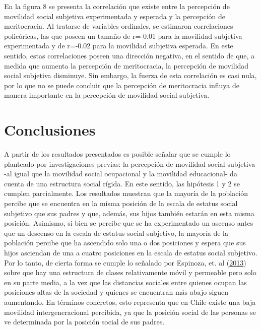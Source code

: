 \documentclass[
]{article}
\begin{document}
En la figura 8 se presenta la correlación que existe entre la percepción
de movilidad social subjetiva experimentada y esperada y la percepción
de meritocracia. Al tratarse de variables ordinales, se estimaron
correlaciones policóricas, las que poseen un tamaño de r=-0.01 para la
movilidad subjetiva experimentada y de r=-0.02 para la movilidad
subjetiva esperada. En este sentido, estas correlaciones poseen una
dirección negativa, en el sentido de que, a medida que aumenta la
percepción de meritocracia, la percepción de movilidad social subjetiva
disminuye. Sin embargo, la fuerza de esta correlación es casi nula, por
lo que no se puede concluir que la percepción de meritocracia influya de
manera importante en la percepción de movilidad social subjetiva.

\newpage

\hypertarget{conclusiones}{%
\section{Conclusiones}\label{conclusiones}}

A partir de los resultados presentados es posible señalar que se cumple
lo planteado por investigaciones previas: la percepción de movilidad
social subjetiva -al igual que la movilidad social ocupacional y la
movilidad educacional- da cuenta de una estructura social rígida. En
este sentido, las hipótesis 1 y 2 se cumplen parcialmente. Los
resultados muestran que la mayoría de la población percibe que se
encuentra en la misma posición de la escala de estatus social subjetivo
que sus padres y que, además, sus hijos también estarán en esta misma
posición. Asimismo, si bien se percibe que se ha experimentado un
ascenso antes que un descenso en la escala de estatus social subjetivo,
la mayoría de la población percibe que ha ascendido solo una o dos
posiciones y espera que sus hijos asciendan de una a cuatro posiciones
en la escala de estatus social subjetivo. Por lo tanto, de cierta forma
se cumple lo señalado por Espinoza, et. al
(\protect\hyperlink{ref-espinoza_Estratificacion_2013}{2013}) sobre que
hay una estructura de clases relativamente móvil y permeable pero solo
en su parte media, a la vez que las distancias sociales entre quienes
ocupan las posiciones altas de la sociedad y quienes se encuentran más
abajo siguen aumentando. En términos concretos, esto representa que en
Chile existe una baja movilidad intergeneracional percibida, ya que la
posición social de las personas se ve determinada por la posición social
de sus padres.
\end{document}

